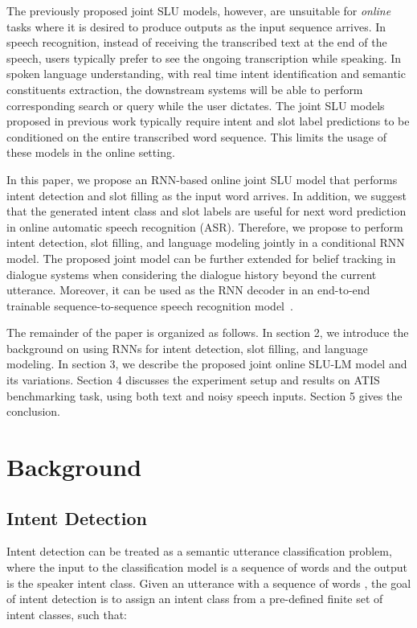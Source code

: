 \documentclass[11pt]{article}
\begin{document}
    The previously proposed joint SLU models, however, are unsuitable for \textit{online} tasks where it is desired to produce outputs as the input sequence arrives. In speech recognition, instead of receiving the transcribed text at the end of the speech, users typically prefer to see the ongoing transcription while speaking. In spoken language understanding, with real time intent identification and semantic constituents extraction, the downstream systems will be able to perform corresponding search or query while the user dictates. The joint SLU models proposed in previous work  typically require intent and slot label predictions to be conditioned on the entire transcribed word sequence. This limits the usage of these models in the online setting.

    In this paper, we propose an RNN-based online joint SLU model that performs intent detection and slot filling as the input word arrives. In addition, we suggest that the generated intent class and slot labels are useful for next word prediction in online automatic speech recognition (ASR). Therefore, we propose to perform intent detection, slot filling, and language modeling jointly in a conditional RNN model. The proposed joint model can be further extended for belief tracking in dialogue systems when considering the dialogue history beyond the current utterance. Moreover, it can be used as the RNN decoder in an end-to-end trainable sequence-to-sequence speech recognition model~\cite{jaitly:15}.
    
    The remainder of the paper is organized as follows. In section 2, we introduce the background on using RNNs for intent detection, slot filling, and language modeling. In section 3, we describe the proposed joint online SLU-LM model and its variations. Section 4 discusses the experiment setup and results on ATIS benchmarking task, using both text and noisy speech inputs. Section 5 gives the conclusion.

\section{Background}
\subsection{Intent Detection}
    Intent detection can be treated as a semantic utterance classification problem, where the input to the classification model is a sequence of words and the output is the speaker intent class. Given an utterance with a sequence of words , the goal of intent detection is to assign an intent class  from a pre-defined finite set of intent classes, such that:
        
\end{document}
